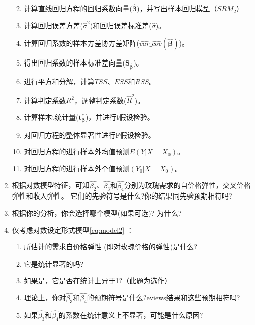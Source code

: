 \documentclass[12pt,(landscape,a4paper),(portrait,a4paper)]{article}
\providecommand{\tightlist}{%
  \setlength{\itemsep}{0pt}\setlength{\parskip}{0pt}}
\begin{document}
\begin{enumerate}
  \begin{enumerate}
  \def\labelenumii{\arabic{enumii}.}
  \tightlist
  \item
    计算直线回归方程的回归系数向量(\(\mathbf{\hat{\beta}}\))，并写出样本回归模型（\(SRM_2\)）\\
  \item
    计算回归误差方差(\(\hat{\sigma}^2\))和回归误差标准差(\(\hat{\sigma}\))。\\
  \item
    计算回归系数的样本方差协方差矩阵(\(\widehat{var}\_\widehat{cov}(\mathbf{\hat{\beta}})\))。\\
  \item
    得出回归系数的样本标准差向量(\(\mathbf{S_{\hat{\beta}}}\))。\\
  \item
    进行平方和分解，计算\(TSS\)、\(ESS\)和\(RSS\)。\\
  \item
    计算判定系数\(R^2\)，调整判定系数(\(\hat{R}^2\))。\\
  \item
    计算样本t统计量(\(\mathbf{t^{\ast}_{\beta}}\))，并进行t假设检验。\\
  \item
    对回归方程的整体显著性进行F假设检验。\\
  \item
    对回归方程的进行样本外均值预测\(E(Y|X=X_0)\)。\\
  \item
    对回归方程的进行样本外个值预测\((Y_0|X=X_0)\)。
  \end{enumerate}
\item
  根据对数模型特征，可知\(\hat{\beta_2}\)、\(\hat{\beta_3}\)和\(\hat{\beta_4}\)分别为玫瑰需求的自价格弹性，交叉价格弹性和收入弹性。
  它们的先验符号是什么?你的结果同先验预期相符吗?\\
\item
  根据你的分析，你会选择哪个模型(如果可选)? 为什么?
\item
  仅考虑对数设定形式模型\eqref{eq:model2} ：

  \begin{enumerate}
  \def\labelenumii{\arabic{enumii}.}
  \tightlist
  \item
    所估计的需求自价格弹性 (即对玫瑰价格的弹性)是什么?\\
  \item
    它是统计显著的吗?\\
  \item
    如果是，它是否在统计上异于1?（此题为选作）\\
  \item
    理论上，你对\(\hat{\beta_3}\)和\(\hat{\beta_4}\)的预期符号是什么?eviews结果和这些预期相符吗?\\
  \item
    如果\(\hat{\beta_3}\)和\(\hat{\beta_4}\)的系数在统计意义上不显著，可能是什么原因?
  \end{enumerate}
\end{enumerate}
\end{document}

